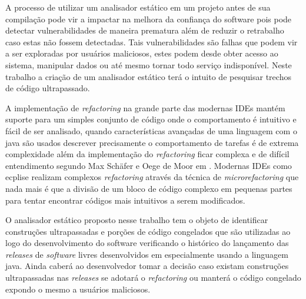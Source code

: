 A processo de utilizar um analisador estático em um projeto antes de sua compilação pode vir a impactar na melhora da confiança do software pois pode detectar vulnerabilidades de maneira prematura além de reduzir o retrabalho caso estas não fossem detectadas. Tais vulnerabilidades são falhas que podem vir a ser exploradas por usuários maliciosos, estes podem desde obter acesso ao sistema, manipular dados ou até mesmo tornar todo serviço indisponível. Neste trabalho a criação de um analisador estático terá o intuito de pesquisar trechos de código ultrapassado.

A implementação de {\it refactoring} na grande parte das modernas IDEs mantém suporte para um simples conjunto de código onde o comportamento é intuitivo e fácil de ser analisado,  quando características avançadas de uma linguagem com o java são usados descrever precisamente o comportamento de tarefas é de extrema complexidade além da implementação do \textit{refactoring} ficar complexa e de difícil entendimento segundo Max Schäfer e Oege de Moor em  \cite{Schaefer:ACM2010}. Modernas IDEs como ecplise realizam complexos \textit{refactoring} através da técnica de {\it microrefactoring} que nada mais é que a divisão de um bloco de código complexo em pequenas partes para tentar encontrar códigos mais intuitivos a serem modificados.

O analisador estático proposto nesse trabalho tem o objeto de identificar construções ultrapassadas e porções de código congelados que são utilizadas ao logo do desenvolvimento do software verificando o histórico do lançamento das {\it releases} de {\it software} livres desenvolvidos em especialmente usando a linguagem java. Ainda caberá ao desenvolvedor tomar a decisão caso existam construções ultrapassadas nas \textit{releases} se adotará o {\it refactoring} ou manterá o código congelado expondo o mesmo a usuários maliciosos.
